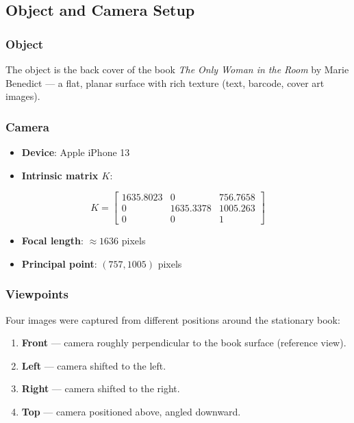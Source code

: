 \documentclass[12pt, a4paper]{article}
\begin{document}
\subsection{Object and Camera Setup}

\subsubsection{Object}

The object is the back cover of the book \emph{The Only Woman in the Room} by Marie Benedict --- a flat, planar surface with rich texture (text, barcode, cover art images).

\subsubsection{Camera}

\begin{itemize}
  \item \textbf{Device}: Apple iPhone 13
  \item \textbf{Intrinsic matrix $K$}:
\end{itemize}

\begin{equation}
  K = \begin{bmatrix}
    1635.8023 & 0 & 756.7658\\
    0 & 1635.3378 & 1005.263\\
    0 & 0 & 1
  \end{bmatrix}
  \label{eq:K}
\end{equation}

\begin{itemize}
  \item \textbf{Focal length}: $\approx 1636$ pixels
  \item \textbf{Principal point}: $(757, 1005)$ pixels
\end{itemize}

\subsubsection{Viewpoints}

Four images were captured from different positions around the stationary book:

\begin{enumerate}
  \item \textbf{Front} --- camera roughly perpendicular to the book surface (reference view).
  \item \textbf{Left} --- camera shifted to the left.
  \item \textbf{Right} --- camera shifted to the right.
  \item \textbf{Top} --- camera positioned above, angled downward.
\end{enumerate}
\end{document}
